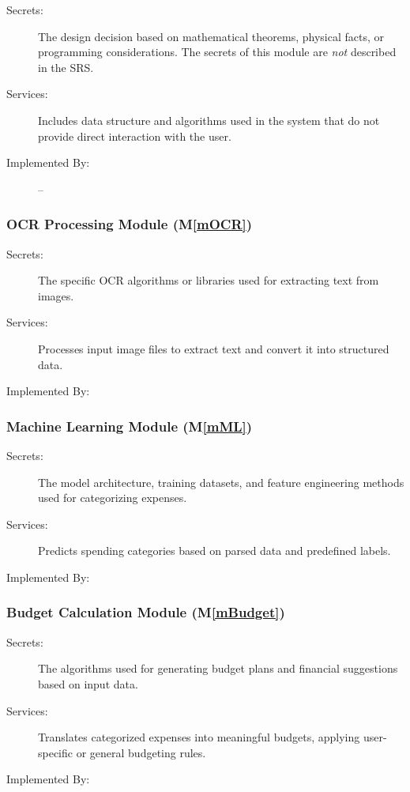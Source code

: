 \documentclass[12pt, titlepage]{article}
\newcommand{\mref}[1]{M\ref{#1}}
\begin{document}
\begin{description}
\item[Secrets:] The design decision based on mathematical theorems, physical
  facts, or programming considerations. The secrets of this module are
  \emph{not} described in the SRS.
\item[Services:] Includes data structure and algorithms used in the system that
  do not provide direct interaction with the user. 
\item[Implemented By:] --
\end{description}

\subsubsection{OCR Processing Module (\mref{mOCR})}

\begin{description}
\item[Secrets:] The specific OCR algorithms or libraries used for extracting text from images.
\item[Services:] Processes input image files to extract text and convert it into structured data.
\item[Implemented By:] \progname
\end{description}

\subsubsection{Machine Learning Module (\mref{mML})}

\begin{description}
\item[Secrets:] The model architecture, training datasets, and feature engineering methods used for categorizing expenses.
\item[Services:] Predicts spending categories based on parsed data and predefined labels.
\item[Implemented By:] \progname
\end{description}

\subsubsection{Budget Calculation Module (\mref{mBudget})}

\begin{description}
\item[Secrets:] The algorithms used for generating budget plans and financial suggestions based on input data.
\item[Services:] Translates categorized expenses into meaningful budgets, applying user-specific or general budgeting rules.
\item[Implemented By:] \progname
\end{description}
\end{document}
